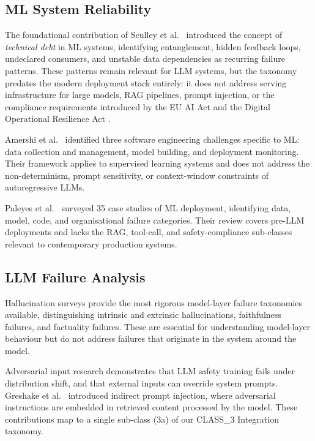 \documentclass{article}
\begin{document}
\subsection{ML System Reliability}

The foundational contribution of Sculley et al.\ \citep{sculley2015debt}
introduced the concept of \emph{technical debt} in ML systems, identifying
entanglement, hidden feedback loops, undeclared consumers, and unstable data
dependencies as recurring failure patterns.  These patterns remain relevant for
LLM systems, but the taxonomy predates the modern deployment stack entirely:
it does not address serving infrastructure for large models, RAG pipelines,
prompt injection, or the compliance requirements introduced by the EU AI Act
\citep{euaiact2024} and the Digital Operational Resilience Act
\citep{dora2022}.

Amershi et al.\ \citep{amershi2019se4ml} identified three software engineering
challenges specific to ML: data collection and management, model building, and
deployment monitoring.  Their framework applies to supervised learning systems
and does not address the non-determinism, prompt sensitivity, or context-window
constraints of autoregressive LLMs.

Paleyes et al.\ \citep{paleyes2022challenges} surveyed 35 case studies of ML
deployment, identifying data, model, code, and organisational failure categories.
Their review covers pre-LLM deployments and lacks the RAG, tool-call, and
safety-compliance sub-classes relevant to contemporary production systems.

\subsection{LLM Failure Analysis}

Hallucination surveys \citep{ji2023hallucination, huang2023survey} provide
the most rigorous model-layer failure taxonomies available, distinguishing
intrinsic and extrinsic hallucinations, faithfulness failures, and factuality
failures.  These are essential for understanding model-layer behaviour but do
not address failures that originate in the system around the model.

Adversarial input research \citep{wei2023jailbroken, perez2022injection}
demonstrates that LLM safety training fails under distribution shift, and that
external inputs can override system prompts.  Greshake et al.\
\citep{greshake2023indirect} introduced indirect prompt injection, where
adversarial instructions are embedded in retrieved content processed by the
model.  These contributions map to a single sub-class (3a) of our CLASS\_3
Integration taxonomy.
\end{document}
